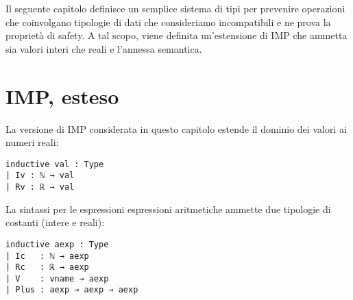 \label{cap7}
Il seguente capitolo definisce un semplice sistema di tipi per prevenire operazioni che coinvolgano tipologie di dati che consideriamo incompatibili e ne prova la proprietà di safety. A tal scopo, viene definita un'estensione di IMP che ammetta sia valori interi che reali e l'annessa semantica.

\section{IMP, esteso}
La versione di IMP considerata in questo capitolo estende il dominio dei valori ai numeri reali:
\begin{verbatim}
inductive val : Type
| Iv : ℕ → val
| Rv : ℝ → val
\end{verbatim}
La sintassi per le espressioni espressioni aritmetiche ammette due tipologie di costanti (intere e reali):
\begin{verbatim}
inductive aexp : Type
| Ic   : ℕ → aexp
| Rc   : ℝ → aexp
| V    : vname → aexp
| Plus : aexp → aexp → aexp
\end{verbatim}

